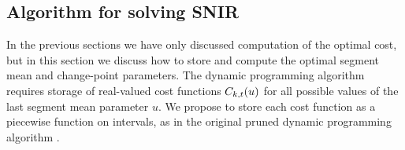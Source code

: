 \documentclass{article}
\begin{document}

\subsection{Algorithm for solving SNIR}
\label{sec:decoding}
In the previous sections we have only discussed computation of the
optimal cost, but in this section we discuss how to store and compute
the optimal segment mean and change-point parameters. The dynamic
programming algorithm requires storage of real-valued cost functions
$C_{k,t}(u)$ for all possible values of the last segment mean
parameter $u$. We propose to store each cost function as a piecewise
function on intervals, as in the original pruned dynamic programming
algorithm \citep{pruned-dp}.
\end{document}
